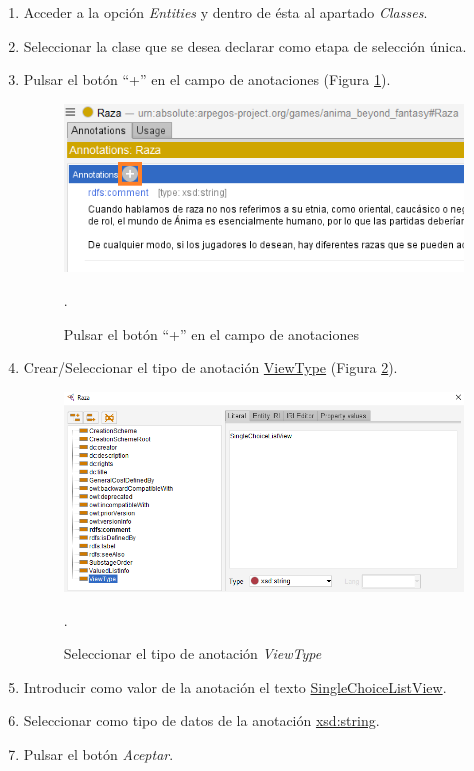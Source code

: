 \begin{enumerate}
    \item Acceder a la opción \textit{Entities} y dentro de ésta al apartado \textit{Classes}.
    \item Seleccionar la clase que se desea declarar como etapa de selección única.
    \item Pulsar el botón “+” en el campo de anotaciones (Figura \ref*{UniqueSelection_1}).
    \begin{figure}[H]
        \centering
        \includegraphics[scale=0.6]{Figures/Protege/UniqueSelection_1.png}
        \caption{Pulsar el botón “+” en el campo de anotaciones}.
        \label{UniqueSelection_1}
    \end{figure}

    \item Crear/Seleccionar el tipo de anotación \underline{ViewType} (Figura \ref*{UniqueSelection_2}).
    \begin{figure}[H]
        \centering
        \includegraphics[scale=0.6]{Figures/Protege/UniqueSelection_2.png}
        \caption{Seleccionar el tipo de anotación \textit{ViewType}}.
        \label{UniqueSelection_2}
    \end{figure}

    \item Introducir como valor de la anotación el texto \underline{SingleChoiceListView}.
    \item Seleccionar como tipo de datos de la anotación \underline{xsd:string}.
    \item Pulsar el botón \textit{Aceptar}.
\end{enumerate}

